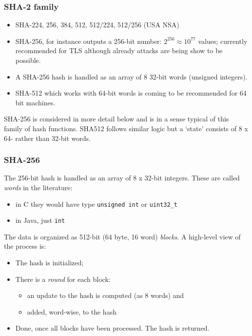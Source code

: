 \documentclass[10pt, hyperref={pdfpagelabels=false}]{beamer}
\begin{document}
\begin{frame}
\frametitle{SHA-2 family}
\begin{itemize}
\item SHA-224, 256, 384, 512, 512/224, 512/256 (USA NSA)
\item SHA-256, for instance outputs a 256-bit number: $2^{256} \approx 10^{77}$ values; currently recommended for TLS although already attacks are being show to be possible.
\item A SHA-256 hash is handled as an array of 8 32-bit words (unsigned integers).
\item SHA-512 which works with 64-bit words is coming to be recommended for 64 bit machines.
\end{itemize}

SHA-256 is considered in more detail below and is in a sense typical of this family of hash functions. SHA512 follows similar logic but a `state' consists of 8 x 64- rather than 32-bit words.
\end{frame}

\begin{frame}
\frametitle{SHA-256}
The 256-bit hash is handled as an array of 8 x 32-bit integers. These are called \emph{words} in the literature:
\begin{itemize}
\item in C they would have type \texttt{unsigned int} or \texttt{uint32\_t}
\item in Java, just \texttt{int}
\end{itemize}

The data is organized as 512-bit (64 byte, 16 word) \emph{\color{blue}blocks}. A high-level view of the process is:
\begin{itemize}
\item The hash is initialized;
\item There is a \emph{round} for each block:
  \begin{itemize}
  \item an update to the hash is computed (as 8 words) and
  \item added, word-wise, to the hash
  \end{itemize}
\item Done, once all blocks have been processed. The hash is returned.
\end{itemize}
\end{frame}
\end{document}
